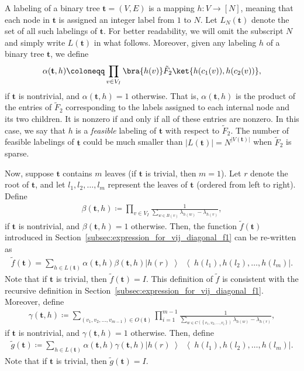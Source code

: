 \documentclass[superscriptaddress,onecolumn,nofootinbib,longbibliography,a4paper,accepted=2026-09-29]{quantumarticle}
\theoremstyle{plain}
\theoremstyle{definition}
\numberwithin{thm}{section}
\numberwithin{assumption}{section}
\numberwithin{lemma}{section}
\numberwithin{prop}{section}
\numberwithin{cor}{section}
\numberwithin{definition}{section}
\numberwithin{rmk}{section}
\numberwithin{equation}{section}
\newcommand{\ketbra}[2]   {\left|#1\middle\rangle\!\middle\langle#2\right|}
\newcommand{\lrcb}[1]{\left \{ #1 \right \}}
\newcommand{\defeq}{\coloneqq}
\newcommand{\mbt}{\mathbf{t}}
\begin{document}
A labeling of a binary tree \( \mbt = (V, E) \) is a mapping \( h: V \to [N] \), meaning that each node in \( \mbt \) is assigned an integer label from \( 1 \) to \( N \). Let \( L_N(\mbt) \) denote the set of all such labelings of \( \mbt \). For better readability, we will omit the subscript \( N \) and simply write \( L(\mbt) \) in what follows. Moreover,  given any labeling $h$ of a binary tree $\mbt$, we define 
\begin{align}
    \alpha(\mbt, h) \defeq \prod_{v \in V_I} \bra{h(v)}\tilde{F}_2 \ket{h(c_1(v)), h(c_2(v))},
    \label{eq:alpha_t_h_def}
\end{align}
if $\mbt$ is nontrivial, and $\alpha(\mbt, h)=1$ otherwise. 
That is, $\alpha(\mbt, h)$ is the product of the entries of $\tilde{F}_2$ corresponding to the labels assigned to each internal node and its two children. It is nonzero if and only if all of these entries are nonzero. In this case, we say that $h$ is a \emph{feasible} labeling of $\mbt$ with respect to $\tilde{F}_2$. The number of feasible labelings of $\mbt$ could be much smaller than $|L(\mbt)|=N^{|V(\mbt)|}$ when $\tilde{F}_2$ is sparse.

Now, suppose $\mbt$ contains $m$ leaves (if $\mbt$ is trivial, then $m=1$). Let $r$ denote the root of $\mbt$, and let $l_1,l_2,\dots,l_m$ represent the leaves of $\mbt$ (ordered from left to right). Define
\begin{align}
    \beta(\mbt, h) \defeq \prod_{ v \in V_I} \frac{1}{\sum_{w \in B(v)} \lambda_{h(w)} -\lambda_{h(v)}},
    \label{eq:beta_t_h_def}
\end{align}
if $\mbt$ is nontrivial, and $\beta(\mbt, h)=1$ otherwise. Then, the function $\tilde{f}(\mbt)$ introduced in Section~\ref{subsec:expression_for_vij_diagonal_f1} can be re-written as
\begin{align}
    \tilde{f}(\mbt) = \sum_{h \in L(\mbt)} \alpha(\mbt, h) \beta(\mbt, h) \ketbra{h(r)}{h(l_1), h(l_2),\dots, h(l_m)}.
    \label{eq:ft_def2}
\end{align}
Note that if $\mbt$ is trivial, then $\tilde{f}(\mbt)=I$. This definition of $\tilde{f}$ is consistent with the recursive definition in Section~\ref{subsec:expression_for_vij_diagonal_f1}.
Moreover, define 
\begin{align}
    \gamma(\mbt, h) \defeq \sum_{(v_1,v_2,\dots,v_{m-1}) \in O(\mbt)} \prod_{i=1}^{m-1}\frac{1}{\sum_{w \in C(\lrcb{v_1,v_2,\dots,v_i})} \lambda_{h(w)} -\lambda_{h(r)}},
    \label{eq:gamma_t_h_def}
\end{align}
if $\mbt$ is nontrivial, and $\gamma(\mbt, h)=1$ otherwise.
Then, define
\begin{align}
    \tilde{g}(\mbt) \defeq \sum_{h \in L(\mbt)} \alpha(\mbt, h) \gamma(\mbt, h) \ketbra{h(r)}{h(l_1), h(l_2),\dots, h(l_m)}.     
\end{align}
Note that if $\mbt$ is trivial, then $\tilde{g}(\mbt)=I$. 
\end{document}
